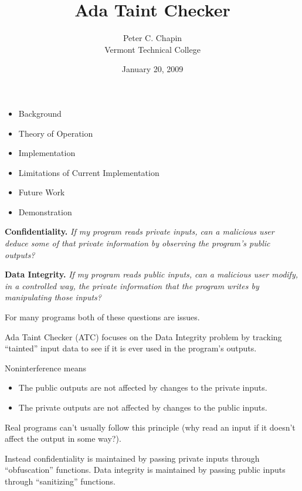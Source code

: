 \documentclass[landscape]{slides}
\begin{document}

\title{Ada Taint Checker}
\author{Peter C. Chapin\\Vermont Technical College}
\date{January 20, 2009}
\maketitle

\begin{itemize}
\item Background
\item Theory of Operation
\item Implementation
\item Limitations of Current Implementation
\item Future Work
\item Demonstration
\end{itemize}
\stopslide

\textbf{Confidentiality.} \textit{If my program reads private inputs, can a malicious user
deduce some of that private information by observing the program's public outputs?}

\textbf{Data Integrity.} \textit{If my program reads public inputs, can a malicious user modify,
in a controlled way, the private information that the program writes by manipulating those
inputs?}

For many programs both of these questions are issues.

Ada Taint Checker (ATC) focuses on the Data Integrity problem by tracking ``tainted'' input data
to see if it is ever used in the program's outputs.
\stopslide

Noninterference means
\begin{itemize}
\item The public outputs are not affected by changes to the private inputs.
\item The private outputs are not affected by changes to the public inputs.
\end{itemize}
Real programs can't usually follow this principle (why read an input if it doesn't affect the
output in some way?).

Instead confidentiality is maintained by passing private inputs through ``obfuscation''
functions. Data integrity is maintained by passing public inputs through ``sanitizing''
functions.
\stopslide
\end{document}
